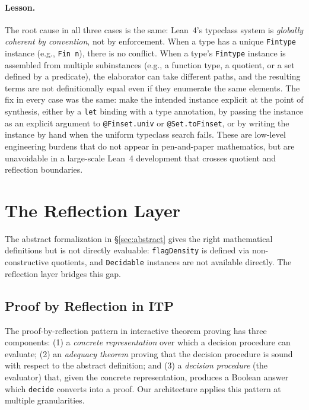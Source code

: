 \documentclass{article}
\newcommand{\lean}[1]{\texttt{#1}}
\begin{document}
\paragraph{Lesson.}
The root cause in all three cases is the same: Lean~4's typeclass system is
\emph{globally coherent by convention}, not by enforcement.  When a type has
a unique \lean{Fintype} instance (e.g., \lean{Fin n}), there is no conflict.
When a type's \lean{Fintype} instance is assembled from multiple subinstances
(e.g., a function type, a quotient, or a set defined by a predicate), the
elaborator can take different paths, and the resulting terms are not
definitionally equal even if they enumerate the same elements.  The fix in
every case was the same: make the intended instance explicit at the point of
synthesis, either by a \lean{let} binding with a type annotation, by passing
the instance as an explicit argument to \lean{@Finset.univ} or
\lean{@Set.toFinset}, or by writing the instance by hand when the uniform
typeclass search fails.  These are low-level engineering burdens that do not
appear in pen-and-paper mathematics, but are unavoidable in a large-scale
Lean~4 development that crosses quotient and reflection boundaries.


\section{The Reflection Layer}
\label{sec:reflection}

The abstract formalization in \S\ref{sec:abstract} gives the right mathematical
definitions but is not directly evaluable: \lean{flagDensity} is defined via
non-constructive quotients, and \lean{Decidable} instances are not available
directly.  The reflection layer bridges this gap.

\subsection{Proof by Reflection in ITP}

The proof-by-reflection pattern in interactive theorem proving has three
components: (1) a \emph{concrete representation} over which a decision
procedure can evaluate; (2) an \emph{adequacy theorem} proving that the
decision procedure is sound with respect to the abstract definition; and (3)
a \emph{decision procedure} (the evaluator) that, given the concrete representation,
produces a Boolean answer which \lean{decide} converts into a proof.  Our
architecture applies this pattern at multiple granularities.
\end{document}
